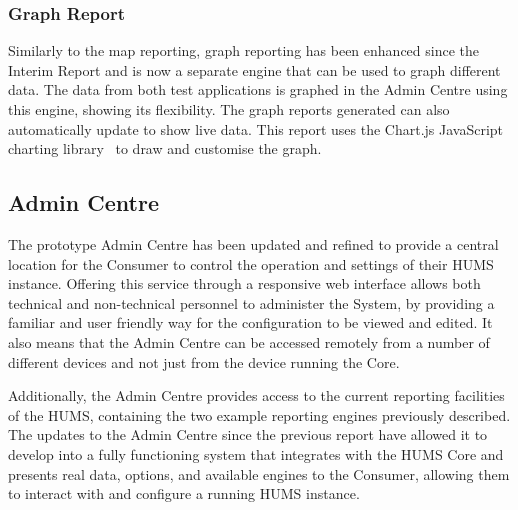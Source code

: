 \documentclass[10pt,a4paper]{article}
\begin{document}
\subsubsection{Graph Report}
Similarly to the map reporting, graph reporting has been enhanced since the Interim Report and is now a separate engine that can be used to graph different data. The data from both test applications is graphed in the Admin Centre using this engine, showing its flexibility. The graph reports generated can also automatically update to show live data. This report uses the Chart.js JavaScript charting library~\cite{chart_js} to draw and customise the graph.

\subsection{Admin Centre}
\label{sec:admin}

The prototype Admin Centre has been updated and refined to provide a central location for the Consumer to control the operation and settings of their HUMS instance. Offering this service through a responsive web interface allows both technical and non-technical personnel to administer the System, by providing a familiar and user friendly way for the configuration to be viewed and edited. It also means that the Admin Centre can be accessed remotely from a number of different devices and not just from the device running the Core.

Additionally, the Admin Centre provides access to the current reporting facilities of the HUMS, containing the two example reporting engines previously described. The updates to the Admin Centre since the previous report have allowed it to develop into a fully functioning system that integrates with the HUMS Core and presents real data, options, and available engines to the Consumer, allowing them to interact with and configure a running HUMS instance.
\end{document}
